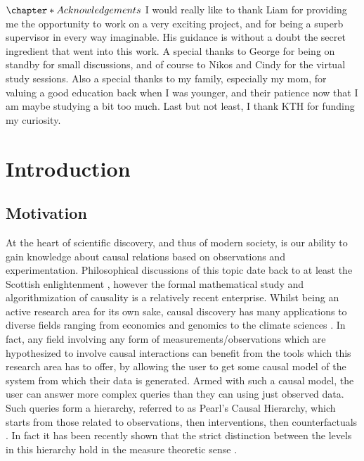 \documentclass{tufte-book}
\begin{document}
\let\cleardoublepage\clearpage


\(\chapter*{Acknowledgements}\)
I would really like to thank Liam for providing me the opportunity to work on a very exciting project, and for being a superb supervisor in every way imaginable. His guidance is without a doubt the secret ingredient that went into this work. A special thanks to George for being on standby for small discussions, and of course to Nikos and Cindy for the virtual study sessions. Also a special thanks to my family, especially my mom, for valuing a good education back when I was younger, and their patience now that I am maybe studying a bit too much. Last but not least, I thank KTH for funding my curiosity.



\setcounter{tocdepth}{1}
\tableofcontents


\chapter{Introduction}
\label{sec:org1cb6fb5}
\label{sec:Intro}
\section{Motivation}
\label{sec:org4aac56c}
At the heart of scientific discovery, and thus of modern society, is our ability to gain knowledge about causal relations based on observations and experimentation. Philosophical discussions of this topic date back to at least the Scottish enlightenment \cite{hume-1748-enquir-concer}, however the formal mathematical study and algorithmization of causality is a relatively recent enterprise. Whilst being an active research area for its own sake, causal discovery has many applications to diverse fields ranging from economics \cite{huenermund-2019-causal-infer} and genomics \cite{hu-2018-applic-causal} to the climate sciences \cite{runge-2019-infer-causat}. In fact, any field involving any form of measurements/observations which are hypothesized to involve causal interactions can benefit from the tools which this research area has to offer, by allowing the user to get some causal model of the system from which their data is generated. Armed with such a causal model, the user can answer more complex queries than they can using just observed data. Such queries form a hierarchy, referred to as Pearl's Causal Hierarchy, which starts from those related to observations, then interventions, then counterfactuals \cite{pearl-2018-book-why}.   In fact it has been recently shown that the strict distinction between the levels in this hierarchy hold in the measure theoretic sense \cite{elias-2020-pearl-hierar}.
\end{document}

